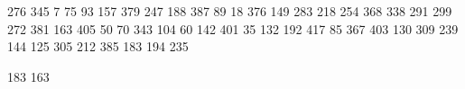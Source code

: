 
\begin{myverbbox}[\small]{\vinput}
    276 345 7 75 93 157 379 247 188 387 89 18 376 149 283 218 254 368 338 
    291 299 272 381 163 405 50 70 343 104 60 142 401 35 132 192 417 85 
    367 403 130 309 239 144 125 305 212 385 183 194 235 
\end{myverbbox}
\begin{myverbbox}[\small]{\voutput}
    183 163
\end{myverbbox}

